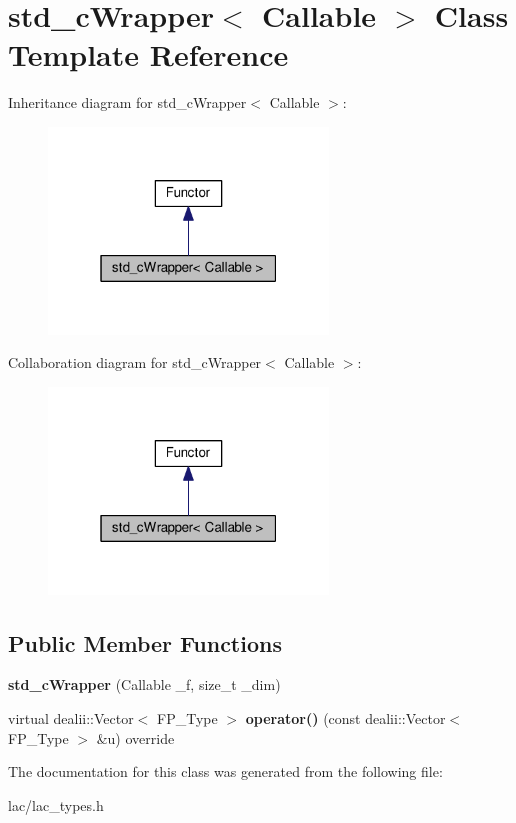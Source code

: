 \hypertarget{classstd__cWrapper}{}\section{std\+\_\+c\+Wrapper$<$ Callable $>$ Class Template Reference}
\label{classstd__cWrapper}


Inheritance diagram for std\+\_\+c\+Wrapper$<$ Callable $>$\+:\nopagebreak
\begin{figure}[H]
\begin{center}
\leavevmode
\includegraphics[width=211pt]{classstd__cWrapper__inherit__graph}
\end{center}
\end{figure}


Collaboration diagram for std\+\_\+c\+Wrapper$<$ Callable $>$\+:\nopagebreak
\begin{figure}[H]
\begin{center}
\leavevmode
\includegraphics[width=211pt]{classstd__cWrapper__coll__graph}
\end{center}
\end{figure}
\subsection*{Public Member Functions}
\begin{DoxyCompactItemize}
\item 
\mbox{\label{classstd__cWrapper_abc23ea41516478630b3fc5119c0b0e8c}} 
{\bfseries std\+\_\+c\+Wrapper} (Callable \+\_\+f, size\+\_\+t \+\_\+dim)
\item 
\mbox{\label{classstd__cWrapper_ad4d39143a0a887c704fce4992c5b1215}} 
virtual dealii\+::\+Vector$<$ F\+P\+\_\+\+Type $>$ {\bfseries operator()} (const dealii\+::\+Vector$<$ F\+P\+\_\+\+Type $>$ \&u) override
\end{DoxyCompactItemize}


The documentation for this class was generated from the following file\+:\begin{DoxyCompactItemize}
\item 
lac/lac\+\_\+types.\+h\end{DoxyCompactItemize}
